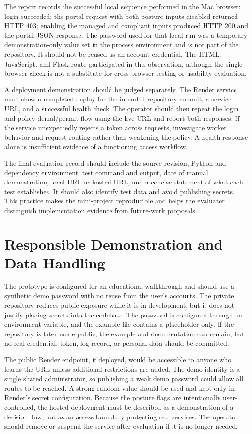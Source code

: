 The report records the successful local sequence performed in the Mac browser: login succeeded; the portal request with both posture inputs disabled returned HTTP 403; enabling the managed and compliant inputs produced HTTP 200 and the portal JSON response. The password used for that local run was a temporary demonstration-only value set in the process environment and is not part of the repository. It should not be reused as an account credential. The HTML, JavaScript, and Flask route participated in this observation, although the single browser check is not a substitute for cross-browser testing or usability evaluation.

A deployment demonstration should be judged separately. The Render service must show a completed deploy for the intended repository commit, a service URL, and a successful health check. The operator should then repeat the login and policy denial/permit flow using the live URL and report both responses. If the service unexpectedly rejects a token across requests, investigate worker behavior and request routing rather than weakening the policy. A health response alone is insufficient evidence of a functioning access workflow.

The final evaluation record should include the source revision, Python and dependency environment, test command and output, date of manual demonstration, local URL or hosted URL, and a concise statement of what each test establishes. It should also identify test data and avoid publishing secrets. This practice makes the mini-project reproducible and helps the evaluator distinguish implementation evidence from future-work proposals.

\section{Responsible Demonstration and Data Handling}
The prototype is configured for an educational walkthrough and should use a synthetic demo password with no reuse from the user's accounts. The private repository reduces public exposure while it is in development, but it does not justify placing secrets into the codebase. The password is configured through an environment variable, and the example file contains a placeholder only. If the repository is later made public, the example and documentation can remain, but no real credential, token, log record, or personal data should be committed.

The public Render endpoint, if deployed, would be accessible to anyone who learns the URL unless additional restrictions are added. The demo identity is a single shared administrator, so publishing a weak demo password could allow all routes to be reached. A strong random value should be used and kept only in Render's secret configuration. Because the posture flags are intentionally user-controlled, the hosted deployment must be described as a demonstration of a decision flow, not as an access boundary protecting real services. The operator should remove or suspend the service after evaluation if it is no longer needed.

